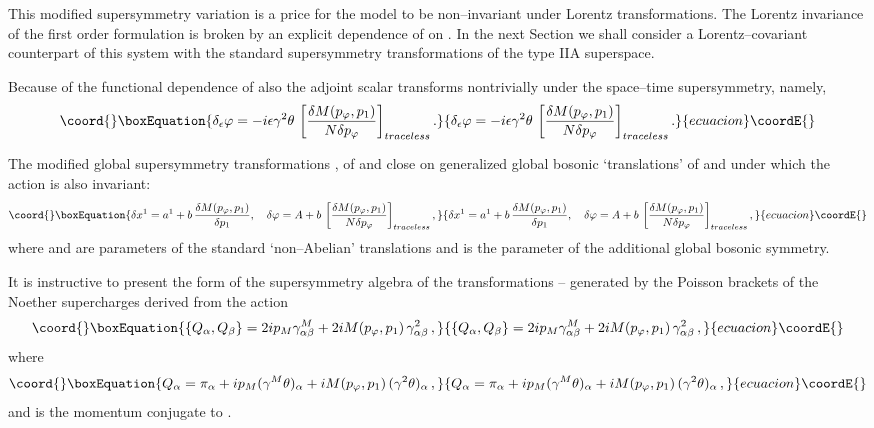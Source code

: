 \documentclass[a4paper,12pt]{article}
\begin{document}
 This modified supersymmetry variation is
 a price for the model to be non--invariant under
\coordHE{} Lorentz transformations. The Lorentz invariance of the first
order formulation is broken by an explicit dependence of \coordHE{} on
\coordHE{}. In the next Section we shall consider a Lorentz--covariant counterpart
of this system with the standard
 supersymmetry transformations  of the type IIA superspace.

Because of the functional dependence of \coordHE{} also
the \coordHE{} adjoint scalar \myHighlight{$\varphi$}\coordHE{} transforms nontrivially under
the space--time supersymmetry, namely,
\begin{equation}\coord{}\boxEquation{\label{varphi}
\delta_\epsilon\varphi=-i\epsilon\gamma^2\theta\,
\left[{{\delta M(p_\varphi,p_1)}\over{N\delta p_\varphi}}\right]_{traceless}.
}{\delta_\epsilon\varphi=-i\epsilon\gamma^2\theta\,
\left[{{\delta M(p_\varphi,p_1)}\over{N\delta p_\varphi}}\right]_{traceless}.
}{ecuacion}\coordE{}\end{equation}

The modified global supersymmetry transformations ,
 of \coordHE{} and \myHighlight{$\varphi$}\coordHE{} close on generalized global bosonic
`translations' of \coordHE{} and \myHighlight{$\varphi$}\coordHE{} under which the action
 is also invariant:
\begin{equation}\coord{}\boxEquation{\label{b}
\delta x^1=a^1+b\,{{\delta
M(p_\varphi,p_1)}\over{\delta p_1}}, \quad
\delta\varphi=A+b\,\left[{{\delta M(p_\varphi,p_1)}
\over{N\delta p_\varphi}}\right]_{traceless},
}{\delta x^1=a^1+b\,{{\delta
M(p_\varphi,p_1)}\over{\delta p_1}}, \quad
\delta\varphi=A+b\,\left[{{\delta M(p_\varphi,p_1)}
\over{N\delta p_\varphi}}\right]_{traceless},
}{ecuacion}\coordE{}\end{equation}
where \coordHE{} and \coordHE{} are parameters of the standard `non--Abelian'
translations and \coordHE{} is the parameter of the additional global
bosonic symmetry.

It is instructive to present the form of the supersymmetry algebra
of the transformations -- generated by the  Poisson
brackets of the Noether supercharges derived from the action
\begin{equation}\coord{}\boxEquation{\label{susya}
\{Q_\alpha,Q_\beta\}=2ip_M\gamma^M_{\alpha\beta}
+2iM(p_\varphi,p_1)\,\gamma^2_{\alpha\beta}\,,
}{\{Q_\alpha,Q_\beta\}=2ip_M\gamma^M_{\alpha\beta}
+2iM(p_\varphi,p_1)\,\gamma^2_{\alpha\beta}\,,
}{ecuacion}\coordE{}\end{equation}
where
\begin{equation}\coord{}\boxEquation{\label{Q}
Q_\alpha=\pi_\alpha+ip_M(\gamma^M\theta)_\alpha +
iM(p_\varphi,p_1)\,(\gamma^2\theta)_\alpha\,,
}{Q_\alpha=\pi_\alpha+ip_M(\gamma^M\theta)_\alpha +
iM(p_\varphi,p_1)\,(\gamma^2\theta)_\alpha\,,
}{ecuacion}\coordE{}\end{equation}
and \myHighlight{$\pi_\alpha$}\coordHE{} is the momentum conjugate to \myHighlight{$\theta^\alpha$}\coordHE{}.
\end{document}
